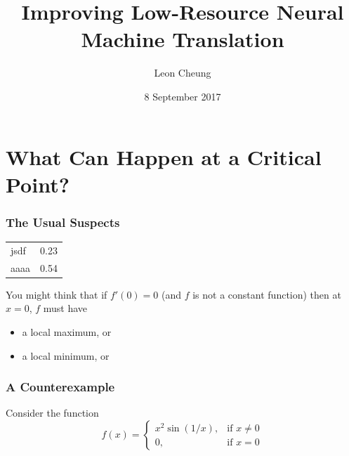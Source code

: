 \documentclass{beamer}
\title{Improving Low-Resource Neural Machine Translation}
\author{Leon Cheung}
\institute{University of California San Diego}
\date{8 September 2017} %
\theoremstyle{definition}
\begin{document}
{
\begin{frame} 
\titlepage
\end{frame}
}

\section{What Can Happen at a Critical Point?} 

\begin{frame} 
\frametitle{The Usual Suspects}

\begin{center}
\begin{tabular}{l | r}
    \hline
    jsdf & 0.23 \\
    aaaa & 0.54
\end{tabular}
\end{center}

You might think that if $f'(0)=0$ (and $f$ is not a constant function) then at 
$x=0$, $f$ must have
\begin{itemize}
\pause \item a local maximum, or 
\pause \item a local minimum, or
\end{itemize}  
\end{frame}

\begin{frame}
\frametitle{A Counterexample}
\alert{Consider} the function 
\[ 
    f(x)=
\begin{cases} 
x^2\sin(1/x), &\text{if }x\neq0 \\
0, &\text{if }x=0
\end{cases}
\]
\end{frame}
\end{document}
